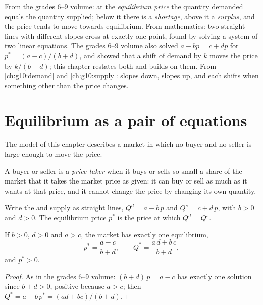 \begin{recall}
From the grades 6--9 volume: at the \emph{equilibrium price} the quantity demanded equals the quantity supplied; below it there is a
\emph{shortage}, above it a \emph{surplus}, and the price tends to move towards equilibrium. From mathematics: two straight lines
with different slopes cross at exactly one point, found by solving a system of two linear equations. The grades 6--9
volume also solved $a - bp = c + dp$ for $p^* = (a - c)/(b + d)$, and showed that a shift of demand by $k$ moves the price by
$k/(b + d)$; this chapter restates both and builds on them. From \cref{ch:g10:demand} and
\cref{ch:g10:supply}:  slopes down,  slopes up, and each shifts when something other than the price changes.
\end{recall}

\section{Equilibrium as a pair of equations}\label{sec:g10:market-equilibrium:system}

The model of this chapter describes a market in which no buyer and no seller is large enough to move the price.

\begin{definition}\label{def:g10:market-equilibrium:price-taker}
A buyer or seller is a \emph{price taker} when it buys or sells so small a share of the market that it takes the
market price as given: it can buy or sell as much as it wants at that price, and it cannot change the price by changing its own
quantity.
\end{definition}

Write the  and supply as straight lines, $Q^d = a - b\,p$ and $Q^s = c + d\,p$, with $b > 0$ and $d > 0$. The equilibrium
price $p^*$ is the price at which $Q^d = Q^s$.

\begin{proposition}\label{prop:g10:market-equilibrium:solution}
If $b > 0$, $d > 0$ and $a > c$, the market has exactly one equilibrium,
\[
  p^* = \frac{a - c}{b + d}, \qquad Q^* = \frac{a\,d + b\,c}{b + d},
\]
and $p^* > 0$.
\end{proposition}
\begin{proof}
As in the grades 6--9 volume: $(b + d)\,p = a - c$ has exactly one solution since $b + d > 0$, positive because $a > c$; then
$Q^* = a - b\,p^* = (ad + bc)/(b + d)$.
\end{proof}


